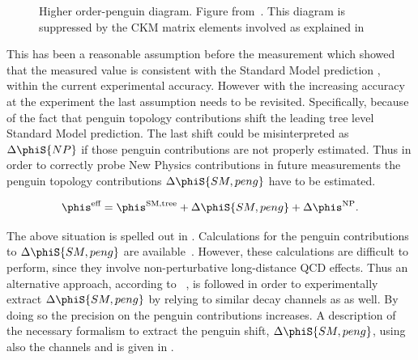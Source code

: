 \begin{figure}[h]
  \centering
  {\sffamily }
  \caption{ Higher order-penguin diagram. Figure from~\cite{jeroenThesis}. This diagram is suppressed by the CKM matrix elements involved as explained in }
  \label{bs2jpsiphi_peng}
\end{figure}

This has been a reasonable assumption before the \lhcb measurement which showed that the measured  value is consistent with the Standard
Model prediction , within the current experimental accuracy. However with the increasing accuracy at the \lhcb experiment the last assumption needs to be revisited.
Specifically, because of the fact that penguin topology contributions shift the leading tree level Standard Model prediction.
The last shift could be misinterpreted as $\Delta\phiS{NP}$ if those penguin contributions are not properly estimated.
Thus in order to correctly probe New Physics contributions in future measurements the penguin topology contributions $\Delta\phiS{SM,peng}$
have to be estimated.

\begin{equation}
 \phis^{\text {eff}} = \phis^{\tiny \text{SM,tree}} + \Delta\phiS{SM,peng} + \Delta\phis^{\tiny \text{NP}}.
 \label{phis_sm_peng}
\end{equation}

\noindent The above situation is spelled out in .
Calculations for the penguin contributions to $\Delta\phiS{SM,peng}$ are available~\cite{Liu:2013nea,Frings:2015eva}.
However, these calculations are difficult to perform, since they involve non-perturbative long-distance QCD effects. Thus an alternative
approach, according to ~\cite{DeBruyn:2014oga,Frings:2015eva,Faller:2008gt,Liu:2013nea,DeBruyn-thesis}, is followed in order to experimentally extract $\Delta\phiS{SM,peng}$ by relying to
similar decay channels as \BsJpsiPhi as well. By doing so the precision on the penguin contributions increases. A description
of the necessary formalism to extract the penguin shift, $\Delta\phiS{SM,peng}$, using also the channels \BsJpsiKst and \BsJpsiRho is
given in .
